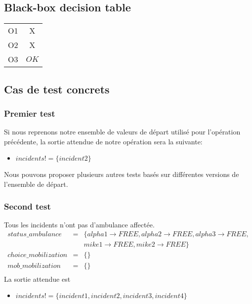 \documentclass{report}
\begin{document}
\subsection{Black-box decision table}

\begin{tabular}{|c|c|}
	\hline
	O1 & X \\
	O2 & X \\
	O3 & $OK$ \\
	\hline
\end{tabular}

\subsection{Cas de test concrets}

\subsubsection{Premier test}
Si nous reprenons notre ensemble de valeurs de départ utilisé pour l'opération
précédente, la sortie attendue de notre opération sera la suivante:
\begin{itemize}
	\item $incidents! = \{incident2\}$
\end{itemize}

Nous pouvons proposer plusieurs autres tests basés sur différentes
versions de l'ensemble de départ.

\subsubsection{Second test}
Tous les incidents n'ont pas d'ambulance affectée. 
\begin{eqnarray*}
status\_ambulance &=& \{alpha1 \rightarrow FREE, alpha2 \rightarrow FREE, alpha3 \rightarrow FREE, \\ 
	&& mike1 \rightarrow FREE, mike2 \rightarrow FREE\} \\
choice\_mobilization &=& \{\} \\
mob\_mobilization &=& \{\} \\
\end{eqnarray*}
La sortie attendue est 
\begin{itemize}
	\item $incidents! = \{incident1, incident2, incident3, incident4\}$
\end{itemize}
\end{document}
